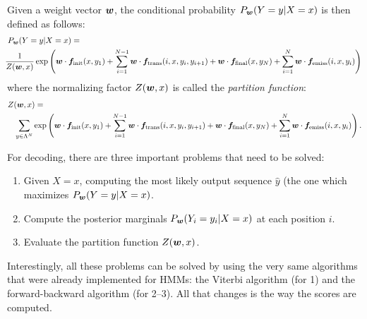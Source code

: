 %
Given a weight vector $\boldsymbol{w}$, the conditional probability $P_{\boldsymbol{w}}(Y=y|X=x)$ is then defined as follows: 
\begin{eqnarray}
\lefteqn{P_{\W}(Y=y|X=x) =}\nonumber\\
&&
\!\!\!\!\!\!\!\!\frac{1}{Z({\W},x)}\exp\left(\W \cdot \F_{\mathrm{init}}(x,y_1) + 
\sum_{i=1}^{N-1} \W \cdot \F_{\mathrm{trans}}(i,x,y_i,y_{i+1})
+
\W \cdot \F_{\mathrm{final}}(x,y_N)
+
\sum_{i=1}^{N} \W \cdot \F_{\mathrm{emiss}}(i,x,y_i)
\right) \label{eq:disc_formula}
\end{eqnarray}
where the normalizing factor $Z(\boldsymbol{w},x)$ is called the \emph{partition function}:
\begin{eqnarray}
\lefteqn{Z(\W,x) =}\nonumber\\ 
&& 
\sum_{y\in \statevocab^N} \exp\left(\W \cdot \F_{\mathrm{init}}(x,y_1) + 
\sum_{i=1}^{N-1} \W \cdot \F_{\mathrm{trans}}(i,x,y_i,y_{i+1})
+
\W \cdot \F_{\mathrm{final}}(x,y_N)
+
\sum_{i=1}^{N} \W \cdot \F_{\mathrm{emiss}}(i,x,y_i)
\right).
\end{eqnarray}

For decoding,  
there are three important problems that need to be solved: 
\begin{enumerate}
\item Given $X=x$, computing the most likely output sequence $\widehat{y}$ (the one which maximizes $P_{\boldsymbol{w}}(Y=y|X=x)$. 
\item Compute the posterior marginals $P_{\boldsymbol{w}}(Y_i=y_i|X=x)$ at each position $i$.
\item Evaluate the partition function $Z(\boldsymbol{w},x)$. 
\end{enumerate}
Interestingly, all these problems can be solved by using the very same
algorithms that were 
already implemented for HMMs: the Viterbi algorithm (for 1) and the forward-backward algorithm (for 2--3). All that changes is the way the scores are computed. 

